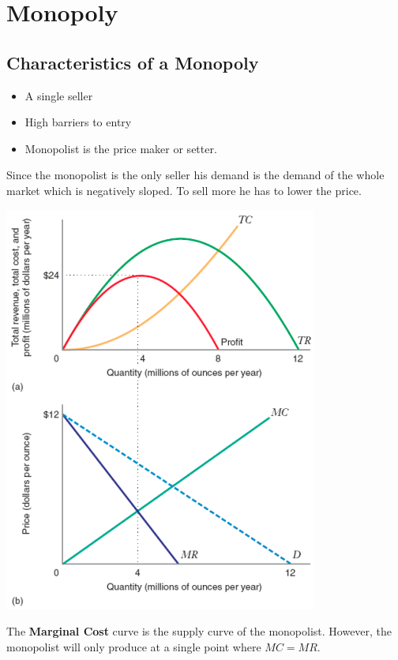 \documentclass[../ECON-281-Notes.tex]{subfiles}
\begin{document}
\chapter{Monopoly}
\section{Characteristics of a Monopoly}
\begin{itemize}
    \item A single seller 
    \item High barriers to entry 
    \item Monopolist is the price maker or setter. 
\end{itemize}
Since the monopolist is the only seller his demand is the demand of the whole market which is negatively sloped. To sell more he has to lower the price.

\includegraphics[width=\columnwidth]{assets/image-2021-12-11-12-25-07.png}

The \textbf{Marginal Cost} curve is the supply curve of the monopolist. However, the monopolist will only produce at a single point where $MC = MR$. 
\end{document}

